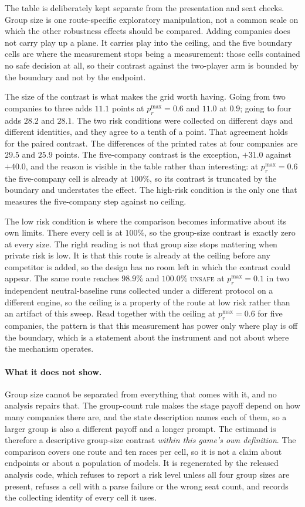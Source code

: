 \documentclass[sigconf,anonymous]{aamas}
\newcommand{\Unsafe}{\textsc{unsafe}}
\begin{document}
The table is deliberately kept separate from the presentation and seat checks.
Group size is one route-specific exploratory manipulation, not a common scale on
which the other robustness effects should be compared. Adding companies does not
carry play up a plane. It carries play into the ceiling, and the five boundary
cells are where the measurement stops being a measurement: those cells
contained no safe decision at all, so their contrast against the two-player arm
is bounded by the boundary and not by the endpoint.

The size of the contrast is what makes the grid worth having. Going from two
companies to three adds $11.1$ points at $p_r^{\max}=0.6$ and $11.0$ at $0.9$;
going to four adds $28.2$ and $28.1$. The two risk conditions were collected on
different days and different identities, and they agree to a tenth of a point.
That agreement holds for the paired contrast. The differences of the printed
rates at four companies are $29.5$ and $25.9$ points. The five-company contrast is the exception, $+31.0$ against $+40.0$, and the
reason is visible in the table rather than interesting: at $p_r^{\max}=0.6$ the
five-company cell is already at $100\%$, so its contrast is truncated by the
boundary and understates the effect. The high-risk condition is the only one
that measures the five-company step against no ceiling.

The low risk condition is where the comparison becomes informative about its
own limits. There every cell is at $100\%$, so the group-size contrast is
exactly zero at every size. The right reading is not that group size stops
mattering when private risk is low. It is that this route is already at the
ceiling before any competitor is added, so the design has no room left in which
the contrast could appear. The same route reaches $98.9\%$ and $100.0\%$ \Unsafe{}
at $p_r^{\max}=0.1$ in two independent neutral-baseline runs collected under a
different protocol on a
different engine, so the ceiling is a property of the route at low risk rather
than an artifact of this sweep. Read together with the ceiling at
$p_r^{\max}=0.6$ for five companies, the pattern is that this measurement has
power only where play is off the boundary, which is a statement about the
instrument and not about where the mechanism operates.

\paragraph{What it does not show.} Group size cannot be separated from
everything that comes with it, and no analysis repairs that. The group-count
rule makes the stage payoff depend on how many companies there are, and the
state description names each of them, so a larger group is also a different
payoff and a longer prompt. The estimand is therefore a descriptive group-size
contrast \emph{within this game's own definition}. The comparison covers one route and ten
races per cell, so it is not a claim about endpoints or about a population of
models. It is regenerated by the released analysis code, which refuses to
report a risk level unless all four group sizes are present, refuses a cell with a parse
failure or the wrong seat count, and records the collecting identity of every
cell it uses.
\end{document}

